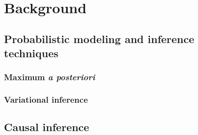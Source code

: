
\chapter{Background}\label{chpt:background}

\section{Probabilistic modeling and inference techniques}\label{chpt:background:sec:inference}

\subsection{Maximum \emph{a posteriori}}

\subsection{Variational inference}

\section{Causal inference}\label{chpt:background:sec:causal}




